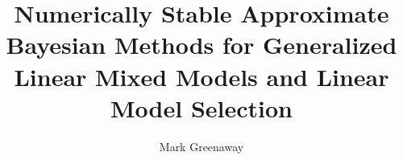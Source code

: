 \documentclass[PhD,stats]{usydthesis}[12pt]
\title{Numerically Stable Approximate Bayesian Methods for Generalized Linear
       Mixed Models and Linear Model Selection}
\author{Mark Greenaway}
\begin{document}
\makeatletter
 
 


\makeatother

\maketitle

\tableofcontents
\listoffigures









% 

\backmatter
\appendix




\end{document}
